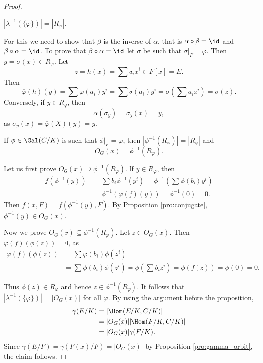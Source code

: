 \begin{proof}
    \begin{claim}
        $|\lambda^{-1}(\{\varphi\})|=|R_\varphi|$. 
    \end{claim}
    
    For this we need to show that $\beta$ is
    the inverse of $\alpha$, that is 
    $\alpha\circ\beta=\id$ and $\beta\circ\alpha=\id$. 
    To prove that $\beta\circ\alpha=\id$ 
    let $\sigma$ be such that $\sigma|_F=\varphi$. 
    Then $y=\sigma(x)\in R_\varphi$. Let
    \[
    z=h(x)=\sum a_ix^i\in F[x]=E.
    \]
    Then  
    \[
    \overline{\varphi}(h)(y)=\sum\varphi(a_i)y^i=\sum\sigma(a_i)y^i
    =\sigma\left(\sum a_ix^i\right)=\sigma(z).
    \]
    Conversely, if $y\in R_\varphi$, then
    \[
    \alpha(\sigma_y)=\sigma_y(x)=y,
    \]
    as $\sigma_y(x)=\overline{\varphi}(X)(y)=y$.
    
    \begin{claim}
        If $\phi\in\Gal(C/K)$ is such that $\phi|_F=\varphi$, then 
        $|\phi^{-1}(R_\varphi)|=|R_{\varphi}|$ and 
        \[
        O_{G}(x)=\phi^{-1}(R_\varphi).
        \]
    \end{claim}

    Let us first prove $O_{G}(x)\supseteq \phi^{-1}(R_\varphi)$.
    If $y\in R_{\varphi}$, 
    then 
    \begin{align*}
    f(\phi^{-1}(y))&=\sum b_i\phi^{-1}(y^i)=\phi^{-1}\left(\sum\phi(b_i)y^i\right)\\
&=\phi^{-1}(\overline{\varphi}(f)(y))=\phi^{-1}(0)=0.
    \end{align*}
    Then $f(x,F)=f(\phi^{-1}(y),F)$. By Proposition \ref{pro:conjugate}, $\phi^{-1}(y)\in O_G(x)$. 
    
    Now we prove $O_{G}(x)\subseteq\phi^{-1}(R_\varphi)$.
    Let $z\in O_{G}(x)$. Then $\overline{\varphi}(f)(\phi(z))=0$, as
    \begin{align*}
    \overline{\varphi}(f)(\phi(z))&=\sum\varphi(b_i)\phi(z^i)\\
    &=\sum\phi(b_i)\phi(z^i)
    =\phi\left(\sum b_iz^i\right)
    =\phi(f(z))=\phi(0)=0.
    \end{align*}
    
    \medskip
    Thus $\phi(z)\in R_{\varphi}$ and hence $z\in\phi^{-1}(R_{\varphi})$. 
    It follows that $|\lambda^{-1}(\{\varphi\})|=|O_{G}(x)|$ for
    all $\varphi$. By using the argument
    before the proposition, 
    \begin{align*}
    \gamma(E/K)&=|\Hom(E/K,C/K)|\\
        &=|O_{G}(x)||\Hom(F/K,C/K)|\\
        &=|O_{G}(x)|\gamma(F/K).
    \end{align*}
    Since $\gamma(E/F)=\gamma(F(x)/F)=|O_{G}(x)|$ by Proposition \ref{pro:gamma_orbit}, the claim follows. 
    

\end{proof}
